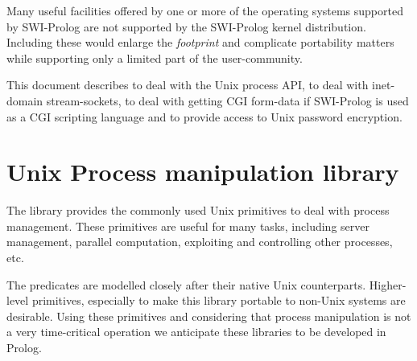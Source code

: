 \documentclass[11pt]{article}
\begin{document}
Many useful facilities offered by one or more of the operating systems
supported by SWI-Prolog are not supported by the SWI-Prolog kernel
distribution.  Including these would enlarge the {\em footprint} and
complicate portability matters while supporting only a limited part of
the user-community.

This document describes  to deal with the Unix process API,
 to deal with inet-domain stream-sockets,  to
deal with getting CGI form-data if SWI-Prolog is used as a CGI scripting
language and  to provide access to Unix password
encryption.


\section{Unix Process manipulation library}

The  library provides the commonly used Unix primitives to
deal with process management. These primitives are useful for many
tasks, including server management, parallel computation, exploiting and
controlling other processes, etc.

The predicates are modelled closely after their native Unix
counterparts. Higher-level primitives, especially to make this library
portable to non-Unix systems are desirable. Using these primitives and
considering that process manipulation is not a very time-critical
operation we anticipate these libraries to be developed in Prolog.
\end{document}
